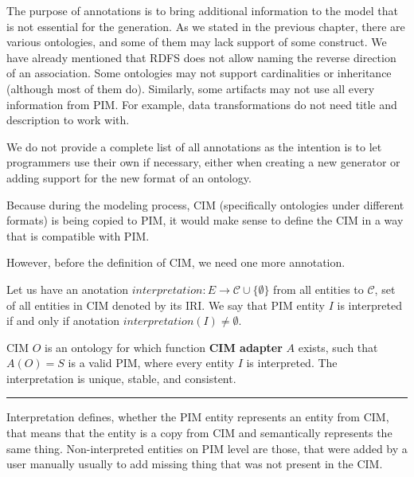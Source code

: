 The purpose of annotations is to bring additional information to the model that is not essential for the generation. As we stated in the previous chapter, there are various ontologies, and some of them may lack support of some construct. We have already mentioned that RDFS does not allow naming the reverse direction of an association. Some ontologies may not support cardinalities or inheritance (although most of them do). Similarly, some artifacts may not use all every information from PIM. For example, data transformations do not need title and description to work with.

We do not provide a complete list of all annotations as the intention is to let programmers use their own if necessary, either when creating a new generator or adding support for the new format of an ontology.

\bigskip

Because during the modeling process, CIM (specifically ontologies under different formats) is being copied to PIM, it would make sense to define the CIM in a way that is compatible with PIM.

However, before the definition of CIM, we need one more annotation.

\begin{definition}[interpretation]
    Let us have an anotation $interpretation: E \rightarrow \mathcal{C} \cup \{\emptyset\}$ from all entities to $\mathcal{C}$, set of all entities in CIM denoted by its IRI. We say that PIM entity $I$ is interpreted if and only if anotation $interpretation(I) \neq \emptyset$.
\end{definition}

\begin{definition}[CIM]
    CIM $O$ is an ontology for which function \textbf{CIM adapter} $A$ exists, such that $A(O) = S$ is a valid PIM, where every entity $I$ is interpreted. The interpretation is unique, stable, and consistent.
\end{definition}


\noindent\rule{8cm}{0.4pt}

\smallskip

Interpretation defines, whether the PIM entity represents an entity from CIM, that means that the entity is a copy from CIM and semantically represents the same thing. Non-interpreted entities on PIM level are those, that were added by a user manually usually to add missing thing that was not present in the CIM.

